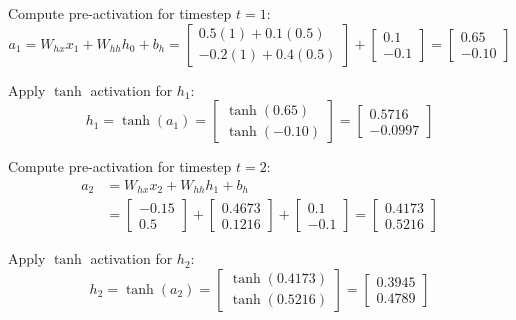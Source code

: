 \documentclass[a4paper,11pt]{article}
\begin{document}
\begin{worked}
\begin{steps}
\item Compute pre-activation for timestep $t=1$:
$$a_1 = W_{hx} x_1 + W_{hh} h_0 + b_h = \begin{bmatrix} 0.5(1) + 0.1(0.5) \\ -0.2(1) + 0.4(0.5) \end{bmatrix} + \begin{bmatrix} 0.1 \\ -0.1 \end{bmatrix} = \begin{bmatrix} 0.65 \\ -0.10 \end{bmatrix}$$
\item Apply $\tanh$ activation for $h_1$:
$$h_1 = \tanh(a_1) = \begin{bmatrix} \tanh(0.65) \\ \tanh(-0.10) \end{bmatrix} = \begin{bmatrix} 0.5716 \\ -0.0997 \end{bmatrix}$$
\item Compute pre-activation for timestep $t=2$:
\begin{align*}
a_2 &= W_{hx} x_2 + W_{hh} h_1 + b_h \\
&= \begin{bmatrix} -0.15 \\ 0.5 \end{bmatrix} + \begin{bmatrix} 0.4673 \\ 0.1216 \end{bmatrix} + \begin{bmatrix} 0.1 \\ -0.1 \end{bmatrix} = \begin{bmatrix} 0.4173 \\ 0.5216 \end{bmatrix}
\end{align*}
\item Apply $\tanh$ activation for $h_2$:
$$h_2 = \tanh(a_2) = \begin{bmatrix} \tanh(0.4173) \\ \tanh(0.5216) \end{bmatrix} = \begin{bmatrix} 0.3945 \\ 0.4789 \end{bmatrix}$$
\end{steps}
\end{worked}
\end{document}
